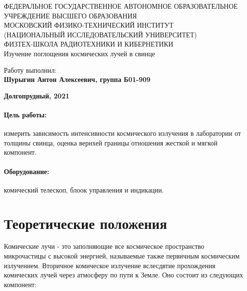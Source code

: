 \documentclass[15pt,a5paper,reqno]{article}
\begin{document}
\begin{center}
  {\small ФЕДЕРАЛЬНОЕ ГОСУДАРСТВЕННОЕ АВТОНОМНОЕ ОБРАЗОВАТЕЛЬНОЕ\\ УЧРЕЖДЕНИЕ ВЫСШЕГО ОБРАЗОВАНИЯ\\ МОСКОВСКИЙ ФИЗИКО-ТЕХНИЧЕСКИЙ ИНСТИТУТ\\ (НАЦИОНАЛЬНЫЙ ИССЛЕДОВАТЕЛЬСКИЙ УНИВЕРСИТЕТ)\\ ФИЗТЕХ-ШКОЛА РАДИОТЕХНИКИ И КИБЕРНЕТИКИ}\\
  \hfill \break
  \hfill \break
  \hfill \break
  \Huge{Изучение поглощения космических лучей в свинце}\\
\end{center}

\hfill \break
\hfill \break
\hfill \break
\hfill \break
\hfill \break
\hfill \break

\begin{flushright}
  \normalsize{Работу выполнил:}\\
  \normalsize{\textbf{Шурыгин Антон Алексеевич, группа Б01-909}}\\
\end{flushright}

\begin{center}
  \normalsize{\textbf{Долгопрудный, 2021}}
\end{center}


\thispagestyle{empty} %


\newpage
\thispagestyle{plain}
\tableofcontents
\thispagestyle{plain}
\newpage


\paragraph{Цель работы:} измерить зависимость интенсивности космического излучения в лаборатории от толщины свинца, оценка вернхей границы отношения жесткой и мягкой компонент.
\paragraph{Оборудование:} комический телескоп, блоок управления и индикации.

\section{Теоретические положения}

Комические лучи - это заполняющие все космическое пространство микрочастицы с высокой энергией, называемые также первичным космическим излучением. 
Вторичное комическое излучение вслесдвтие прохождения комических лучей через атмосферу по пути к Земле. Оно состоит из следующих компонент:
\end{document}
